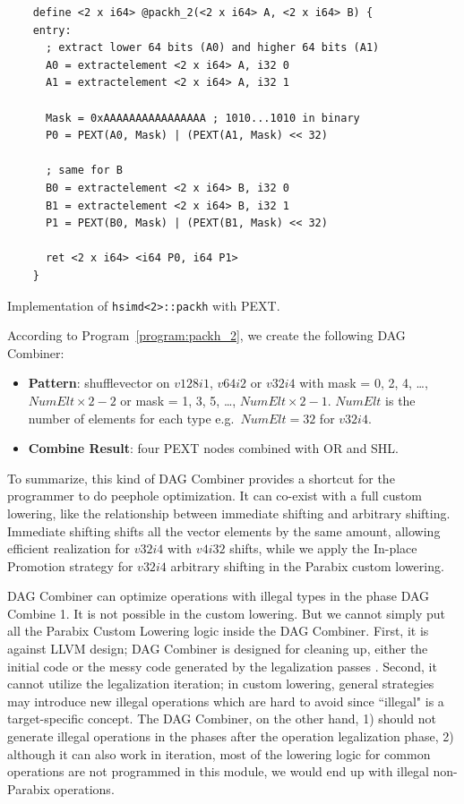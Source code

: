 \begin{program}[htbp!]
\begin{verbatim}
    define <2 x i64> @packh_2(<2 x i64> A, <2 x i64> B) {
    entry:
      ; extract lower 64 bits (A0) and higher 64 bits (A1)
      A0 = extractelement <2 x i64> A, i32 0
      A1 = extractelement <2 x i64> A, i32 1

      Mask = 0xAAAAAAAAAAAAAAAA ; 1010...1010 in binary
      P0 = PEXT(A0, Mask) | (PEXT(A1, Mask) << 32)

      ; same for B
      B0 = extractelement <2 x i64> B, i32 0
      B1 = extractelement <2 x i64> B, i32 1
      P1 = PEXT(B0, Mask) | (PEXT(B1, Mask) << 32)

      ret <2 x i64> <i64 P0, i64 P1>
    }
\end{verbatim}
\caption{Implementation of {\tt hsimd<2>::packh} with PEXT.}
\label{program:packh_2}
\end{program}

According to Program~\ref{program:packh_2}, we create the following DAG Combiner:
\begin{itemize}
    \item \textbf{Pattern}: shufflevector on $v128i1$, $v64i2$ or $v32i4$ with mask = 0, 2, 4, \ldots, $NumElt \times 2-2$ or mask = 1, 3, 5, \ldots, $NumElt \times 2 -1$. $NumElt$ is the number of elements for each type e.g.\ $NumElt=32$ for $v32i4$.
    \item \textbf{Combine Result}: four PEXT nodes combined with OR and SHL.
\end{itemize}

To summarize, this kind of DAG Combiner provides a shortcut for the programmer to do peephole optimization. It can co-exist with a full custom lowering, like the relationship between immediate shifting and arbitrary shifting. Immediate shifting shifts all the vector elements by the same amount, allowing efficient realization for $v32i4$ with $v4i32$ shifts, while we apply the In-place Promotion strategy for $v32i4$ arbitrary shifting in the Parabix custom lowering.

DAG Combiner can optimize operations with illegal types in the phase DAG Combine 1. It is not possible in the custom lowering. But we cannot simply put all the Parabix Custom Lowering logic inside the DAG Combiner. First, it is against LLVM design; DAG Combiner is designed for cleaning up, either the initial code or the messy code generated by the legalization passes \cite{llvm_code_gen}. Second, it cannot utilize the legalization iteration; in custom lowering, general strategies may introduce new illegal operations which are hard to avoid since ``illegal" is a target-specific concept. The DAG Combiner, on the other hand, 1) should not generate illegal operations in the phases after the operation legalization phase, 2) although it can also work in iteration, most of the lowering logic for common operations are not programmed in this module, we would end up with illegal non-Parabix operations.

